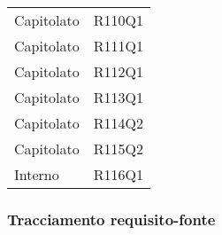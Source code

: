 \documentclass[../analisi-dei-requisiti.tex]{subfiles}
\begin{document}
\begin{longtable}[H]{ p{4cm} | p{4cm} }
  Capitolato                    & R110Q1                               \\
  Capitolato                    & R111Q1                               \\
  Capitolato                    & R112Q1                               \\
  Capitolato                    & R113Q1                               \\
  Capitolato                    & R114Q2                               \\
  Capitolato                    & R115Q2                               \\
  Interno                       & R116Q1                               \\
\end{longtable}

\newpage
\subsubsection{Tracciamento requisito-fonte}%
\label{subs:tracciamento_requisito-fonte}
\end{document}
